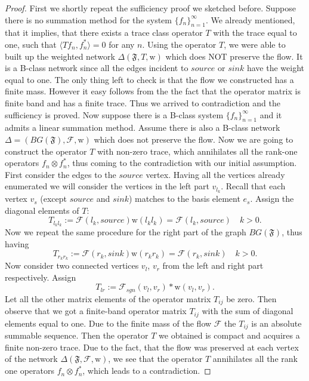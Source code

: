 \documentclass[12pt]{article}
\theoremstyle{definition}
\newcommand{\seq}[1]{\{{#1}_n\}_{n=1}^\infty}
\newcommand{\fsys}{\mathfrak{F}}
\newcommand{\wt}{\mathrm{w}}
\newcommand{\flow}{\mathcal{F}}
\newcommand{\flowsgn}{\mathcal{F}_{sgn}}
\newcommand{\source}{\mathit{source}}
\newcommand{\sink}{\mathit{sink}}
\newcommand{\scal}[2]{\langle {#1}, {#2} \rangle}
\newcommand{\net}{\Delta}
\numberwithin{remark}{section}
\numberwithin{theorem}{section}
\numberwithin{prop}{section}
\numberwithin{equation}{section}
\numberwithin{lemma}{section}
\numberwithin{prop_under_lemma}{lemma}
\begin{document}
    \begin{proof}
      First we shortly repeat the sufficiency proof we sketched before.
      Suppose there is no summation method for the system $\seq{f}$.
      We already mentioned, that it implies, that there exists a trace class operator $T$ with
      the trace equal to one, such that $\scal{Tf_n}{f_n^*} = 0$ for any $n$.
      Using the operator $T$, we were able to built up the weighted network
      $\net(\fsys, T, \wt)$ which does NOT preserve the flow. 
      It is a B-class network since all the edges incident to $\source$ or $\sink$ have the weight
      equal to one.
      The only thing left to check is that the flow we constructed has a finite mass.
      However it easy follows from the the fact that the operator matrix is finite band and has a finite trace.
      Thus we arrived to contradiction and the sufficiency is proved.
      Now suppose there is a B-class system $\seq{f}$ and it admits a linear summation method.
      Assume there is also a B-class network $\net = (BG(\fsys), \flow, \wt)$ which does not preserve the flow.
      Now we are going to construct the operator $T$ with non-zero trace, which annihilates all the rank-one
      operators $f_n \otimes f^*_n$, thus coming to the contradiction with our initial assumption.
      First consider the edges to the $\source$ vertex. Having all the vertices already enumerated
      we will consider the vertices in the left part $v_{l_k}$.
      Recall that each vertex $v_s$ (except $\source$ and $\sink$) matches to the basis element $e_s$.
      Assign the diagonal elements of $T$:
      $$
        T_{l_k l_k} := \flow(l_k, \source) \wt(l_k l_k) = \flow(l_k, \source) \quad k > 0.
      $$
      Now we repeat the same procedure for the right part of the graph $BG(\fsys)$, thus having
      $$
        T_{r_k r_k} := \flow(r_k, \sink) \wt(r_k r_k) = \flow(r_k, \sink) \quad k > 0.
      $$
      Now consider two connected vertices $v_l$, $v_r$ from the left and right part
      respectively. Assign
      $$
        T_{lr} := \flowsgn(v_l, v_r) * \wt(v_l, v_r).
      $$
      Let all the other matrix elements of the operator matrix $T_{ij}$ be zero.
      Then observe that we got a finite-band operator matrix $T_{ij}$ with the sum of diagonal elements
      equal to one.
      Due to the finite mass of the flow $\flow$ the $T_{ij}$ is an absolute summable sequence.
      Then the operator $T$ we obtained is compact and acquires a finite non-zero trace.
      Due to the fact, that the flow was preserved at each vertex of the network $\net(\fsys, \flow, \wt)$,
      we see that the operator $T$ annihilates all the rank one operators $f_n \otimes f^*_n$,
      which leads to a contradiction.
    \end{proof}
    
\end{document}
